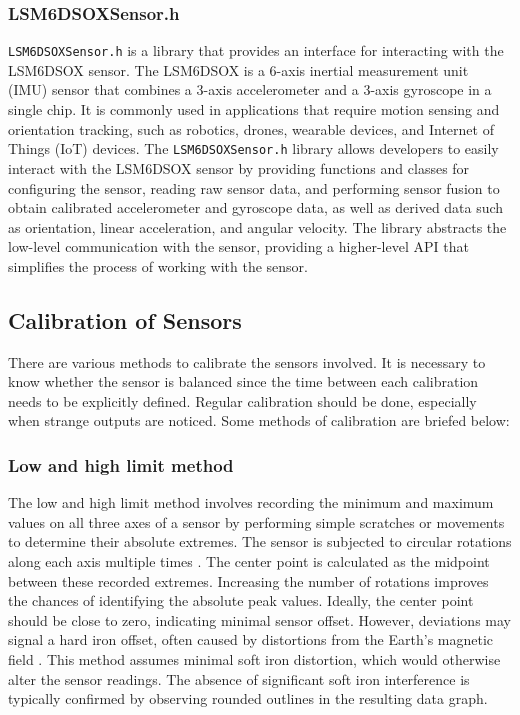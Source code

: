 \subsubsection{LSM6DSOXSensor.h}
\texttt{LSM6DSOXSensor.h} is a library that provides an interface for interacting with the LSM6DSOX sensor. The LSM6DSOX is a 6-axis inertial measurement unit (IMU) sensor that combines a 3-axis accelerometer and a 3-axis gyroscope in a single chip. It is commonly used in applications that require motion sensing and orientation tracking, such as robotics, drones, wearable devices, and Internet of Things (IoT) devices. The \texttt{LSM6DSOXSensor.h} library allows developers to easily interact with the LSM6DSOX sensor by providing functions and classes for configuring the sensor, reading raw sensor data, and performing sensor fusion to obtain calibrated accelerometer and gyroscope data, as well as derived data such as orientation, linear acceleration, and angular velocity. The library abstracts the low-level communication with the sensor, providing a higher-level API that simplifies the process of working with the sensor.

\subsection{Calibration of Sensors}
There are various methods to calibrate the sensors involved. It is necessary to know whether the sensor is balanced since the time between each calibration needs to be explicitly defined. Regular calibration should be done, especially when strange outputs are noticed. Some methods of calibration are briefed below:

\subsubsection{Low and high limit method}
The low and high limit method involves recording the minimum and maximum values on all three axes of a sensor by performing simple scratches or movements to determine their absolute extremes. The sensor is subjected to circular rotations along each axis multiple times \cite{Edm:2015}.
The center point is calculated as the midpoint between these recorded extremes. Increasing the number of rotations improves the chances of identifying the absolute peak values. Ideally, the center point should be close to zero, indicating minimal sensor offset. However, deviations may signal a hard iron offset, often caused by distortions from the Earth's magnetic field \cite{Edm:2015}.
This method assumes minimal soft iron distortion, which would otherwise alter the sensor readings. The absence of significant soft iron interference is typically confirmed by observing rounded outlines in the resulting data graph.


